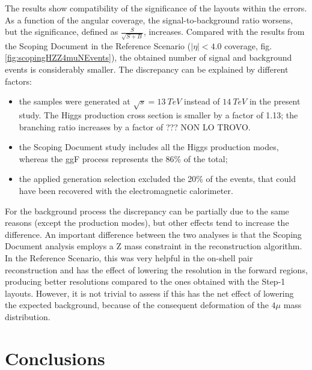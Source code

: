 \documentclass[a4paper,twoside,12pt]{article}
\begin{document}
The results show compatibility of the significance of the layouts within the errors. As a function of the angular coverage, the 
signal-to-background ratio worsens, but the significance, defined as $\frac{S}{\sqrt{S+B}}$, increases. 
Compared with the results from the Scoping Document in the Reference Scenario 
($|\eta| < 4.0$ coverage, fig.\ref{fig:scopingHZZ4muNEvents}), the obtained number of
signal and background events is considerably smaller. The discrepancy can be explained by 
different factors:\\
\begin{itemize}
\item the samples were generated at $\sqrt{s} = 13\ TeV$ instead of $14\ TeV$ in the present study. The Higgs
production cross section is smaller by a factor of 1.13; the branching ratio increases by a factor of ??? NON LO TROVO.
\item the Scoping Document study includes all the Higgs production modes, whereas the ggF process represents the 86\% of 
the total;
\item the applied generation selection excluded the 20\% of the events, that could have been recovered with
	the electromagnetic calorimeter.
\end{itemize} 

For the background process the discrepancy can be partially due to the same reasons (except the production modes), but other effects tend to increase the difference. 
An important difference between the two analyses is that the Scoping Document analysis employs a Z mass constraint
in the reconstruction algorithm. In the Reference Scenario, this was very helpful in the on-shell pair reconstruction and
has the effect of lowering the resolution in the forward regions, producing better resolutions compared to the
ones obtained with the Step-1 layouts. However, it is not trivial to assess if this has the net effect of lowering the expected
background, because of the consequent deformation of the $4\mu$ mass distribution. 

\newpage
\section{Conclusions}\label{sec:conclusions}
\newpage
\end{document}
